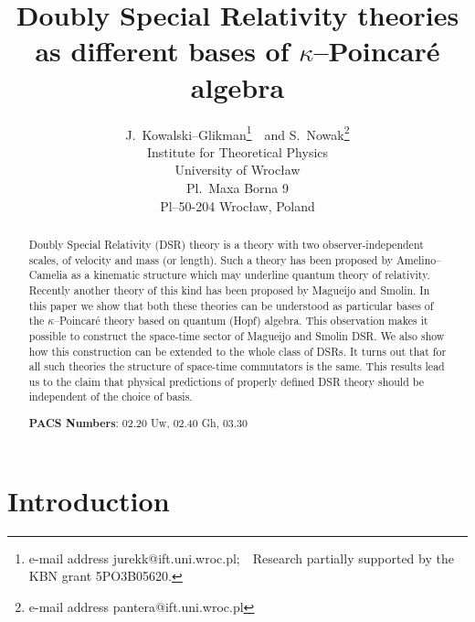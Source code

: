 \documentclass[a4paper,a4paper]{article}
\begin{document}
\title{%
Doubly Special Relativity theories as different bases of
$\kappa$--Poincar\'e algebra}
\author{ J.\ Kowalski--Glikman\thanks{e-mail
address jurekk@ift.uni.wroc.pl;\ \ Research  partially supported
by the    KBN grant 5PO3B05620.}~~and S.\ Nowak\thanks{e-mail
address pantera@ift.uni.wroc.pl}\\ Institute for Theoretical
Physics\\ University of Wroc\l{}aw\\ Pl.\ Maxa Borna 9\\
Pl--50-204 Wroc\l{}aw, Poland} \maketitle

\begin{abstract}
Doubly Special Relativity (DSR) theory is a theory with two
observer-independent scales, of velocity and mass  (or length).
Such a theory has been proposed by Amelino--Camelia as a kinematic
structure which may underline quantum theory of relativity.
Recently another theory of this kind has been proposed by Magueijo
and Smolin. In this paper we show that both these theories can be
understood as particular bases of the $\kappa$--Poincar\'e theory
based on quantum (Hopf) algebra. This observation makes it
possible to construct the space-time sector of Magueijo and Smolin
DSR. We  also show how this construction can be extended to the
whole class of DSRs. It turns out that for all such theories the
structure of space-time commutators is the same. This results lead
us to the claim that physical predictions of properly defined DSR
theory should be independent of the choice of basis.
\newline

{\bf PACS Numbers}: 02.20 Uw, 02.40 Gh, 03.30
\end{abstract}

\clearpage

\section{Introduction}
\end{document}
